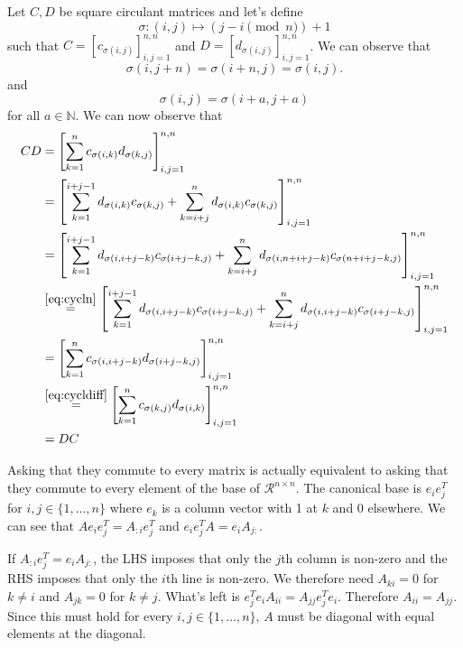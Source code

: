 \begin{solution}
  Let $C,D$ be square circulant matrices and let's define
  \[ \sigma : (i,j) \mapsto (j - i \pmod{n})+1 \]
  such that
  $C = [c_{\sigma(i,j)}]_{i,j=1}^{n,n}$ and
  $D = [d_{\sigma(i,j)}]_{i,j=1}^{n,n}$.
  We can observe that
  \begin{equation}
    \label{eq:cycln}
    \sigma(i,j+n) = \sigma(i+n,j) = \sigma(i,j).
  \end{equation}
  and
  \begin{equation}
    \label{eq:cycldiff}
    \sigma(i,j) = \sigma(i+a,j+a)
  \end{equation}
  for all $a \in \mathbb{N}$.
  We can now observe that
  \begin{align*}
    CD
    & =
    \left[
      \sum_{k=1}^n
      c_{\sigma(i,k)}d_{\sigma(k,j)}
    \right]_{i,j=1}^{n,n}\\
    & =
    \left[
      \sum_{k=1}^{i+j-1}
      d_{\sigma(i,k)}c_{\sigma(k,j)}
      +
      \sum_{k=i+j}^{n}
      d_{\sigma(i,k)}c_{\sigma(k,j)}
    \right]_{i,j=1}^{n,n}\\
    & =
    \left[
      \sum_{k=1}^{i+j-1}
      d_{\sigma(i,i+j-k)}c_{\sigma(i+j-k,j)}
      +
      \sum_{k=i+j}^{n}
      d_{\sigma(i,n+i+j-k)}c_{\sigma(n+i+j-k,j)}
    \right]_{i,j=1}^{n,n}\\
    & \stackrel{\eqref{eq:cycln}}{=}
    \left[
      \sum_{k=1}^{i+j-1}
      d_{\sigma(i,i+j-k)}c_{\sigma(i+j-k,j)}
      +
      \sum_{k=i+j}^{n}
      d_{\sigma(i,i+j-k)}c_{\sigma(i+j-k,j)}
    \right]_{i,j=1}^{n,n}\\
    & =
    \left[
      \sum_{k=1}^n
      c_{\sigma(i,i+j-k)}d_{\sigma(i+j-k,j)}
    \right]_{i,j=1}^{n,n}\\
    & \stackrel{\eqref{eq:cycldiff}}{=}
    \left[
      \sum_{k=1}^n
      c_{\sigma(k,j)}d_{\sigma(i,k)}
    \right]_{i,j=1}^{n,n}\\
    & = DC
  \end{align*}
\end{solution}

\begin{solution}
  Asking that they commute to every matrix is actually equivalent to asking
  that they commute to every element of the base of $\mathcal{R}^{n \times n}$.
  The canonical base is $e_ie_j^T$ for $i,j \in \{1, \ldots, n\}$ where
  $e_k$ is a column vector with 1 at $k$ and 0 elsewhere.
  We can see that $Ae_ie_j^T = A_{:i}e_j^T$ and $e_ie_j^TA = e_iA_{j:}$.

  If $A_{:i}e_j^T = e_iA_{j:}$, the LHS imposes that only the $j$th column is non-zero
  and the RHS imposes that only the $i$th line is non-zero.
  We therefore need $A_{ki} = 0$ for $k \neq i$ and $A_{jk} = 0$ for $k \neq j$.
  What's left is $e_j^Te_iA_{ii} = A_{jj}e_j^Te_i$.
  Therefore $A_{ii} = A_{jj}$.
  Since this must hold for every $i,j \in \{1, \ldots, n\}$, $A$ must be diagonal
  with equal elements at the diagonal.
\end{solution}

